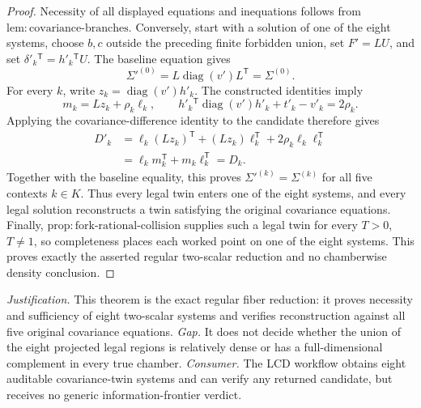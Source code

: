 \documentclass{article}
\begin{document}
\begin{proof}
Necessity of all displayed equations and inequations follows from \(\mathrm{lem:covariance\text{-}branches}\). Conversely, start with a solution of one of the eight systems, choose \(b,c\) outside the preceding finite forbidden union, set \(F'=LU\), and set \(\delta'_k{}^{\mathsf T}=h'_k{}^{\mathsf T}U\). The baseline equation gives
\[
 \Sigma'^{(0)}=L\operatorname{diag}(v')L^{\mathsf T}=\Sigma^{(0)}.
\]
For every \(k\), write \(z_k=\operatorname{diag}(v')h'_k\). The constructed identities imply
\[
 m_k=Lz_k+\rho_k\ell_k,\qquad
 h'_k{}^{\mathsf T}\operatorname{diag}(v')h'_k+t'_k-v'_k=2\rho_k.
\]
Applying the covariance-difference identity to the candidate therefore gives
\[
\begin{aligned}
 D'_k
 &=\ell_k(Lz_k)^{\mathsf T}+(Lz_k)\ell_k^{\mathsf T}
   +2\rho_k\ell_k\ell_k^{\mathsf T}\\
 &=\ell_km_k^{\mathsf T}+m_k\ell_k^{\mathsf T}
 =D_k.
\end{aligned}
\]
Together with the baseline equality, this proves \(\Sigma'^{(k)}=\Sigma^{(k)}\) for all five contexts \(k\in K\). Thus every legal twin enters one of the eight systems, and every legal solution reconstructs a twin satisfying the original covariance equations. Finally, \(\mathrm{prop:fork\text{-}rational\text{-}collision}\) supplies such a legal twin for every \(T>0\), \(T\ne1\), so completeness places each worked point on one of the eight systems. This proves exactly the asserted regular two-scalar reduction and no chamberwise density conclusion.
\end{proof}
\par\smallskip\noindent \textit{Justification.} This theorem is the exact regular fiber reduction: it proves necessity and sufficiency of eight two-scalar systems and verifies reconstruction against all five original covariance equations. \textit{Gap.} It does not decide whether the union of the eight projected legal regions is relatively dense or has a full-dimensional complement in every true chamber. \textit{Consumer.} The LCD workflow obtains eight auditable covariance-twin systems and can verify any returned candidate, but receives no generic information-frontier verdict.
\end{document}
